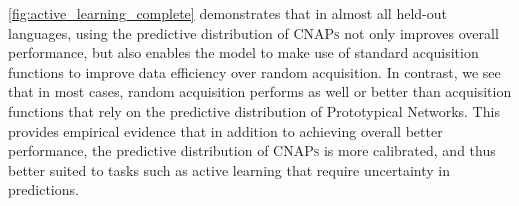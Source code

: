 \documentclass{article}
\theoremstyle{definition}
\newcommand{\cnaps}{\textsc{CNAPs}}
\begin{document}
\cref{fig:active_learning_complete} demonstrates that in almost all held-out languages, using the predictive distribution of \cnaps{} not only improves overall performance, but also enables the model to make use of standard acquisition functions \citep{cohn1996active} to improve data efficiency over random acquisition. In contrast, we see that in most cases, random acquisition performs as well or better than acquisition functions that rely on the predictive distribution of Prototypical Networks. This provides empirical evidence that in addition to achieving overall better performance, the predictive distribution of \cnaps{} is more calibrated, and thus better suited to tasks such as active learning that require uncertainty in predictions.



\clearpage
\newpage
\end{document}

